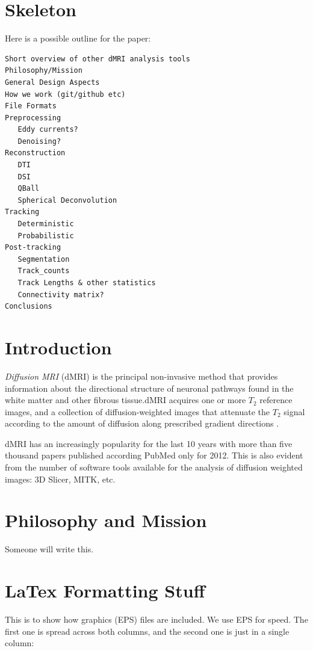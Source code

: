 \documentclass{bioinfo}
\begin{document}
\section{Skeleton}

Here is a possible outline for the paper:

\begin{verbatim}
Short overview of other dMRI analysis tools
Philosophy/Mission
General Design Aspects
How we work (git/github etc)
File Formats 
Preprocessing
   Eddy currents?
   Denoising?
Reconstruction
   DTI 
   DSI
   QBall
   Spherical Deconvolution 
Tracking
   Deterministic
   Probabilistic
Post-tracking
   Segmentation
   Track_counts
   Track Lengths & other statistics
   Connectivity matrix?
Conclusions
\end{verbatim}


\section{Introduction}

\emph{Diffusion MRI} (dMRI) \citep{stejskal-tanner:65, lebihan-breton:85,merboldt-hanicke-etal:85, taylor-bushell:85, callaghan:91} is the principal non-invasive method that provides information about the directional structure of neuronal pathways found in the white matter and other fibrous tissue.dMRI acquires one or more $T_{2}$ reference images, and a collection of diffusion-weighted images that attenuate the $T_{2}$ signal according to the amount of diffusion along prescribed gradient directions \citep{behrens-johansen-berg:09, jones:10}. 

dMRI has an increasingly popularity for the last 10 years with more than five thousand papers published according PubMed only for 2012. This is also evident from the number of software tools available for the analysis of diffusion weighted images: 3D Slicer, MITK, etc.



\section{Philosophy and Mission}

Someone will write this.

\section{LaTex Formatting Stuff}

This is to show how graphics (EPS) files are included. We use EPS for
speed. The first one is spread across both columns, and the second one
is just in a single column:
\end{document}
